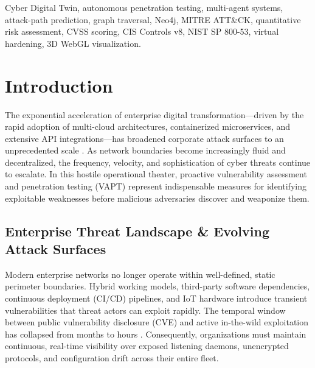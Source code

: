 \documentclass[conference]{IEEEtran}
\begin{document}
\begin{IEEEkeywords}
Cyber Digital Twin, autonomous penetration testing, multi-agent systems, attack-path prediction, graph traversal, Neo4j, MITRE ATT\&CK, quantitative risk assessment, CVSS scoring, CIS Controls v8, NIST SP 800-53, virtual hardening, 3D WebGL visualization.
\end{IEEEkeywords}

\section{Introduction}
The exponential acceleration of enterprise digital transformation---driven by the rapid adoption of multi-cloud architectures, containerized microservices, and extensive API integrations---has broadened corporate attack surfaces to an unprecedented scale \cite{ferrag2022cyber}. As network boundaries become increasingly fluid and decentralized, the frequency, velocity, and sophistication of cyber threats continue to escalate. In this hostile operational theater, proactive vulnerability assessment and penetration testing (VAPT) represent indispensable measures for identifying exploitable weaknesses before malicious adversaries discover and weaponize them.

\subsection{Enterprise Threat Landscape \& Evolving Attack Surfaces}
Modern enterprise networks no longer operate within well-defined, static perimeter boundaries. Hybrid working models, third-party software dependencies, continuous deployment (CI/CD) pipelines, and IoT hardware introduce transient vulnerabilities that threat actors can exploit rapidly. The temporal window between public vulnerability disclosure (CVE) and active in-the-wild exploitation has collapsed from months to hours \cite{sommer2010outside}. Consequently, organizations must maintain continuous, real-time visibility over exposed listening daemons, unencrypted protocols, and configuration drift across their entire fleet.
\end{document}
